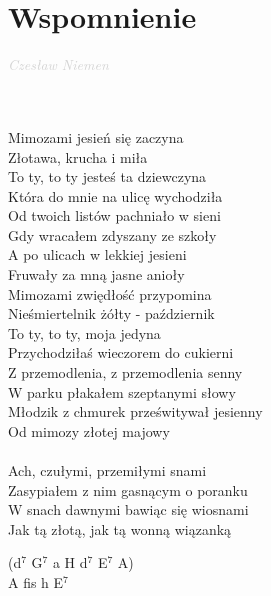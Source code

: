 \documentclass[a5paper, 10pt]{book}
\begin{document}
\newpage
\section{Wspomnienie}\textcolor{lightgray}{\textit{Czesław Niemen}}\\~\\
\begin{minipage}[t]{0.7\textwidth}
  ~\\
  Mimozami jesień się zaczyna\\
  Złotawa, krucha i miła\\
  To ty, to ty jesteś ta dziewczyna\\
  Która do mnie na ulicę wychodziła\\
  \hspace*{5mm}Od twoich listów pachniało w sieni\\
  \hspace*{5mm}Gdy wracałem zdyszany ze szkoły\\
  \hspace*{5mm}A po ulicach w lekkiej jesieni\\
  \hspace*{5mm}Fruwały za mną jasne anioły\\

  Mimozami zwiędłość przypomina\\
  Nieśmiertelnik żółty - październik\\
  To ty, to ty, moja jedyna\\
  Przychodziłaś wieczorem do cukierni\\
  \hspace*{5mm}Z przemodlenia, z przemodlenia senny\\
  \hspace*{5mm}W parku płakałem szeptanymi słowy\\
  \hspace*{5mm}Młodzik z chmurek prześwitywał jesienny\\
  \hspace*{5mm}Od mimozy złotej majowy\\
  \\
  \hspace*{5mm}Ach, czułymi, przemiłymi snami\\
  \hspace*{5mm}Zasypiałem z nim gasnącym o poranku\\
  \hspace*{5mm}W snach dawnymi bawiąc się wiosnami\\
  \hspace*{5mm}Jak tą złotą, jak tą wonną wiązanką\\
\end{minipage}
\begin{minipage}[t]{0.3\textwidth}
  (d$^7$ G$^7$ a H d$^7$ E$^7$ A)\\
  A fis h E$^7$\\
\end{minipage}
\end{document}
